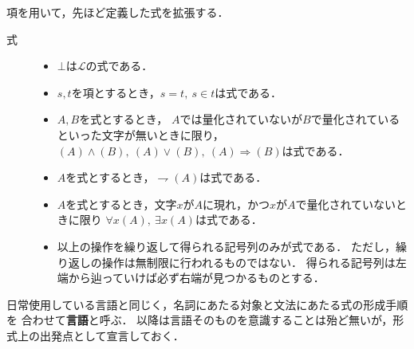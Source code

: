 	
	項を用いて，先ほど定義した式を拡張する．
	\begin{description}
		\item[式] 
			\begin{itemize}
				\item $\bot$は$\mathcal{L}$の式である．
				
				\item $s,t$を項とするとき，$s=t,\ s \in t$は式である．
					
				\item $A,B$を式とするとき，
					$A$では量化されていないが$B$で量化されているといった文字が無いときに限り，
					$(A) \wedge (B),\ (A) \vee (B),\ (A)\Longrightarrow (B)$は式である．
				
				\item $A$を式とするとき，$\rightharpoondown (A)$は式である．
				
				\item $A$を式とするとき，文字$x$が$A$に現れ，かつ$x$が$A$で量化されていないときに限り
					$\forall x (A),\ \exists x (A)$は式である．
				
				\item 以上の操作を繰り返して得られる記号列のみが式である．
					ただし，繰り返しの操作は無制限に行われるものではない．
					得られる記号列は左端から辿っていけば必ず右端が見つかるものとする．
			\end{itemize}
	\end{description}
	
	
	日常使用している言語と同じく，名詞にあたる対象と文法にあたる式の形成手順を
	合わせて{\bf 言語}と呼ぶ．
	以降は言語そのものを意識することは殆ど無いが，形式上の出発点として宣言しておく．
	
